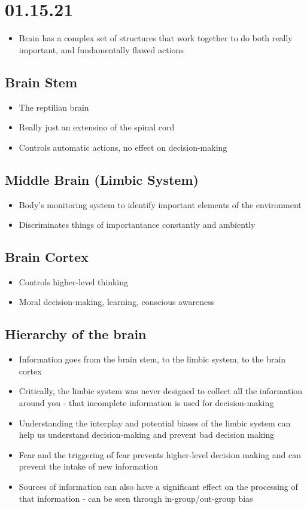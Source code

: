 \documentclass[11pt]{article}
\begin{document}
\section{01.15.21}
\label{sec:orgee3e686}
\begin{itemize}
\item Brain has a complex set of structures that work together to do both really important, and fundamentally flawed actions
\end{itemize}
\subsection{Brain Stem}
\label{sec:org7ff2b1d}
\begin{itemize}
\item The reptilian brain
\item Really just an extensino of the spinal cord
\item Controls automatic actions, no effect on decision-making
\end{itemize}
\subsection{Middle Brain (Limbic System)}
\label{sec:orgf545d03}
\begin{itemize}
\item Body's monitoring system to identify important elements of the environment
\item Discriminates things of importantance constantly and ambiently
\end{itemize}
\subsection{Brain Cortex}
\label{sec:orge3d0151}
\begin{itemize}
\item Controls higher-level thinking
\item Moral decision-making, learning, conscious awareness
\end{itemize}
\subsection{Hierarchy of the brain}
\label{sec:org5ff5968}
\begin{itemize}
\item Information goes from the brain stem, to the limbic system, to the brain cortex
\item Critically, the limbic system was never designed to collect all the information around you - that incomplete information is used for decision-making
\item Understanding the interplay and potential biases of the limbic system can help us understand decision-making and prevent bad decision making
\item Fear and the triggering of fear prevents higher-level decision making and can prevent the intake of new information
\item Sources of information can also have a significant effect on the processing of that information - can be seen through in-group/out-group bias
\end{itemize}
\end{document}
